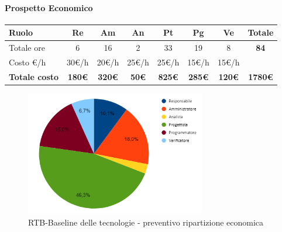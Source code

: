 \paragraph{Prospetto Economico}
\begin{center}
	\renewcommand{\arraystretch}{1.8} %
	\begin{tabular}{ |m{10em}|c|c|c|c|c|c|c| }
	\hline
	\textbf{Ruolo} & \textbf{Re} & \textbf{Am} &  \textbf{An} &  \textbf{Pt} &  \textbf{Pg} &  \textbf{Ve} &  \textbf{Totale}\\
    \hline
    Totale ore & 6 & 16 & 2 & 33 & 19 & 8 & \textbf{84}\\
    \hline
    Costo \euro/h & 30\euro/h & 20\euro/h & 25\euro/h & 25\euro/h & 15\euro/h & 15\euro/h & \\
    \hline
    \textbf{Totale costo} & \textbf{180\euro} & \textbf{320\euro} &  \textbf{50\euro} &  \textbf{825\euro} &  \textbf{285\euro} &  \textbf{120\euro} &  \textbf{1780\euro}\\
    \hline
	\end{tabular}

    \begin{figure}[H]
        \centering\includegraphics[width=0.7\textwidth, height=0.7\textheight, keepaspectratio]{images/preventivo/RTB-tecnologico-costo.png}
        \caption{RTB-Baseline delle tecnologie - preventivo ripartizione economica}
    \end{figure}
    
\end{center}

\newpage